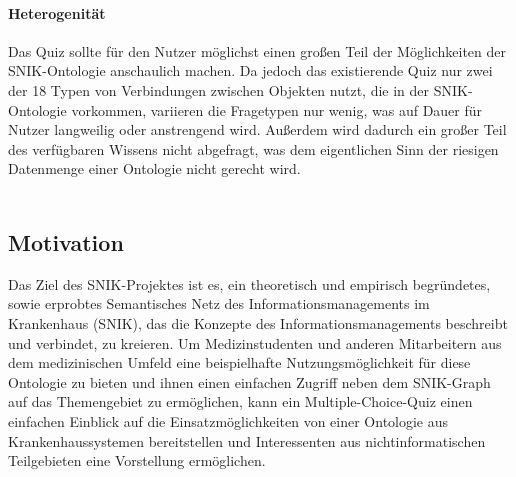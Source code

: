 \documentclass[headsepline,titlepage,ngerman,twoside,12pt]{report}
\newcommand\todo[1]{}%
\begin{document}
\paragraph{Heterogenität}
Das Quiz sollte für den Nutzer möglichst einen großen Teil der Möglichkeiten der SNIK-Ontologie anschaulich machen.
Da jedoch das existierende Quiz nur zwei der 18 Typen von Verbindungen zwischen Objekten nutzt, die in der SNIK-Ontologie vorkommen, variieren die Fragetypen nur wenig, was auf Dauer für Nutzer langweilig oder anstrengend wird.
Außerdem wird dadurch ein großer Teil des verfügbaren Wissens nicht abgefragt, was dem eigentlichen Sinn der riesigen Datenmenge einer Ontologie nicht gerecht wird.
\\\\\todo{
\begin{itemize}
\item Worin bestehen die Probleme?
\item Warum ist die geschilderte vorliegende Situation problematisch?
\item Für wen ist sie problematisch?
\end{itemize}
Aus den Papers bzw. dem Antrag des Forschungsprojektes entnehmen.\\
}\todo{
Hier ist auf die generelle Problemlage einzugehen, die dem Aufsatz im Wissenschaftsfeld zu Grunde liegt.\\
Bsp.: Daten aus der Krankenversorgung stehen aus rechtlichen und technischen Gründen nicht für die Forschung zur Verfügung, sodass klinische Forscher eigene Datenerhebungen planen müssen.
}
\subsection{Motivation}
\label{sub:Motivation}
Das Ziel des SNIK-Projektes ist es, ein theoretisch und empirisch begründetes, sowie erprobtes Semantisches Netz des Informationsmanagements im Krankenhaus (SNIK), das die Konzepte des Informationsmanagements beschreibt und verbindet, zu kreieren.
Um Medizinstudenten und anderen Mitarbeitern aus dem medizinischen Umfeld eine beispielhafte Nutzungsmöglichkeit für diese Ontologie zu bieten und ihnen einen einfachen Zugriff neben dem SNIK-Graph auf das Themengebiet zu ermöglichen, kann ein Multiple-Choice-Quiz einen einfachen Einblick auf die Einsatzmöglichkeiten von einer Ontologie aus Krankenhaussystemen bereitstellen und Interessenten aus nichtinformatischen Teilgebieten eine Vorstellung ermöglichen.
\end{document}
